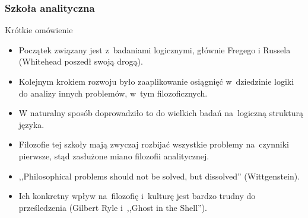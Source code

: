 
\begin{frame}
\frametitle{Szkoła analityczna}
\begin{block}{Krótkie omówienie}
\begin{itemize}
\item Początek związany jest z~badaniami logicznymi, głównie Fregego i Russela (Whitehead poszedł swoją drogą).
\item Kolejnym krokiem rozwoju było zaaplikowanie osiągnięć w~dziedzinie logiki do analizy innych problemów, w~tym filozoficznych.
\item W naturalny sposób doprowadziło to do wielkich badań na~logiczną strukturą języka.
\item Filozofie tej szkoły mają zwyczaj rozbijać wszystkie problemy na~czynniki pierwsze, stąd zasłużone miano filozofii analitycznej.
\item ,,Philosophical problems should not be solved, but dissolved'' (Wittgenstein).
\item Ich konkretny wpływ na~filozofię i~kulturę jest bardzo trudny do prześledzenia (Gilbert Ryle i~,,Ghost in the Shell'').
\end{itemize}
\end{block}
\end{frame}

